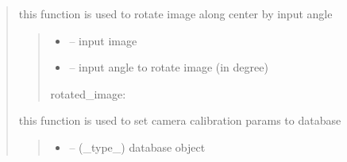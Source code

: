 \documentclass[letterpaper,10pt,english]{sphinxmanual}
\begin{document}
\begin{quote}
\begin{savenotes}\begin{fulllineitems}
\label{\detokenize{setting/backend/camera_funcs:oxin.backend.camera_funcs.rotate_calibration_image}}
\pysigstartsignatures
{}
\pysigstopsignatures
\sphinxAtStartPar
this function is used to rotate image along center by input angle
\begin{quote}\begin{description}
\begin{itemize}
\item {} 
\sphinxAtStartPar
{} – input image

\item {} 
\sphinxAtStartPar
{} – input angle to rotate image (in degree)

\end{itemize}

\sphinxAtStartPar
rotated\_image:

\end{description}\end{quote}

\end{fulllineitems}\end{savenotes}


\begin{savenotes}\begin{fulllineitems}
\label{\detokenize{setting/backend/camera_funcs:oxin.backend.camera_funcs.set_camera_calibration_params_to_db}}
\pysigstartsignatures
{}
\pysigstopsignatures
\sphinxAtStartPar
this function is used to set camera calibration params to database
\begin{quote}\begin{description}
\begin{itemize}
\item {} 
\sphinxAtStartPar
{} – (\_type\_) database object


\end{itemize}
\end{description}
\end{quote}
\end{fulllineitems}
\end{savenotes}
\end{quote}
\end{document}
